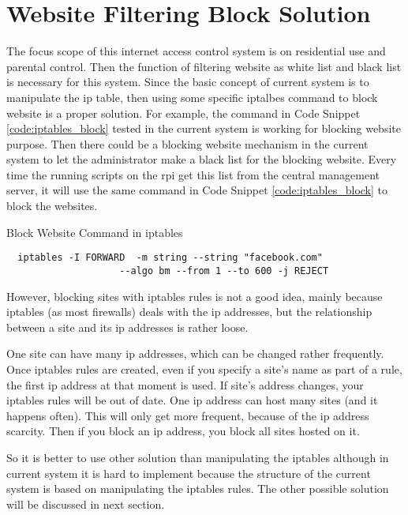 \section{Website Filtering Block Solution}
\par The focus scope of this internet access control system is on residential use and parental control. Then the function of filtering website as white list and black list is necessary for this system. Since the basic concept of current system is to manipulate the \gls{ip} table, then using some specific iptalbes command to block website is a proper solution. For example, the command in Code Snippet \ref{code:iptables_block} tested in the current system is working for blocking website purpose. Then there could be a blocking website mechanism in the current system to let the administrator make a black list for the blocking website. Every time the running scripts on the \gls{rpi} get this list from the central management server, it will use the same command in Code Snippet \ref{code:iptables_block}
 to block the websites.
\begin{algorithm}[h]
  \caption{Block Website Command in iptables}
  \label{code:iptables_block}
  \begin{verbatim}
  iptables -I FORWARD  -m string --string "facebook.com" 
  					--algo bm --from 1 --to 600 -j REJECT
 \end{verbatim}
\end{algorithm}

\par However, blocking sites with iptables rules is not a good idea, mainly because iptables (as most firewalls) deals with the \gls{ip} addresses, but the relationship between a site and its \gls{ip} addresses is rather loose.

\par One site can have many \gls{ip} addresses, which can be changed rather frequently. Once iptables rules are created, even if you specify a site's name as part of a rule, the first \gls{ip} address at that moment is used. If site's address changes, your iptables rules will be out of date. One \gls{ip} address can host many sites (and it happens often). This will only get more frequent, because of the \gls{ip} address scarcity. Then if you block an \gls{ip} address, you block all sites hosted on it.

\par So it is better to use other solution than manipulating the iptables although in current system it is hard to implement because the structure of the current system is based on manipulating the iptables rules. The other possible solution will be discussed in next section.

